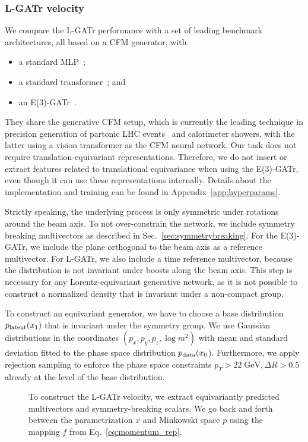 \documentclass[submission, Phys]{SciPost}
\begin{document}
\subsubsection*{L-GATr velocity}

We compare the L-GATr performance with a set of leading benchmark architectures, all based on a CFM generator, with
%
\begin{itemize}
\item a standard MLP~\cite{Butter:2023fov};
\item a standard transformer~\cite{Huetsch:2024quz}; and
\item an E(3)-GATr~\cite{brehmer2023geometric}.
\end{itemize}
%
They share the generative CFM setup, which is currently the leading technique in precision generation of partonic LHC events~\cite{Butter:2023fov} and calorimeter showers, with the latter using a vision transformer as the CFM neural network. Our task does not require translation-equivariant representations. Therefore, we do not insert or extract features related to translational equivariance when using the E(3)-GATr, even though it can use these representations internally. Details about the implementation and training can be found in Appendix~\ref{app:hyperparams}.

Strictly speaking, the underlying process is only symmetric under rotations around the beam axis. To not over-constrain the network, we include symmetry breaking multivectors as described in Sec.~\ref{sec:symmetrybreaking}. For the E(3)-GATr, we include the plane orthogonal to the beam axis as a reference multivector. For L-GATr, we also include a time reference multivector, because the distribution is not invariant under boosts along the beam axis. This step is necessary for any Lorentz-equivariant generative network, as it is not possible to construct a normalized density that is invariant under a non-compact group. 

To construct an equivariant generator, we have to choose a base distribution $p_\text{latent} (x_1)$ that is invariant under the symmetry group. We use Gaussian distributions in the coordinates $(p_x, p_y, p_z, \log m^2)$ with mean and standard deviation fitted to the phase space distribution $p_\text{data} (x_0$). Furthermore, we apply rejection sampling to enforce the phase space constraints $p_T>22\;\mathrm{GeV}, \Delta R > 0.5$ already at the level of the base distribution. 

\begin{figure}[t]
    \centering
    
    \caption{To construct the L-GATr velocity, we extract \textcolor{gatrgreen}{equivariantly predicted multivectors} and \textcolor{gatrred}{symmetry-breaking scalars}. We go back and forth between the parametrization $x$ and Minkowski space $p$ using the \textcolor{gatrblue}{mapping $f$} from Eq.~\eqref{eq:momentum_rep}.}
    \label{fig:equicfm}
\end{figure}
\end{document}
